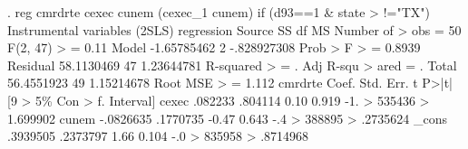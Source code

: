 . reg cmrdrte cexec cunem (cexec_1 cunem) if (d93==1 \& state
> !="TX")
{\smallskip}
Instrumental variables (2SLS) regression
{\smallskip}
      Source {\VBAR}       SS           df       MS      Number of
>  obs   =        50
   F(2, 47) 
>        =      0.11
       Model {\VBAR} -1.65785462         2 -.828927308   Prob > F 
>        =    0.8939
    Residual {\VBAR}  58.1130469        47  1.23644781   R-squared
>        =         .
   Adj R-squ
> ared   =         .
       Total {\VBAR}  56.4551923        49  1.15214678   Root MSE 
>        =     1.112
{\smallskip}
     cmrdrte {\VBAR}      Coef.   Std. Err.      t    P>|t|     [9
> 5\% Con                                                    
>       f. Interval]
       cexec {\VBAR}    .082233    .804114     0.10   0.919    -1.
> 535436                                                    
>           1.699902
       cunem {\VBAR}  -.0826635   .1770735    -0.47   0.643    -.4
> 388895                                                    
>           .2735624
       _cons {\VBAR}   .3939505   .2373797     1.66   0.104    -.0
> 835958                                                    
>           .8714968
{\smallskip}
